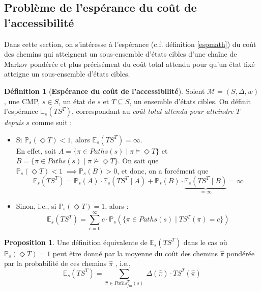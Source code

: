 \documentclass[12pt,a4paper]{report}
\theoremstyle{definition}%
\newtheorem{definition}{Définition}[chapter]
\newtheorem{proposition}{Proposition}[chapter]
\theoremstyle{remark}
\newcommand{\ie}{i.e., }
\newcommand{\cf}{c.f. }
\newcommand{\pr}{\mathbb{P}}
\let\labelitemi\labelitemii
\begin{document}
\subsection{Problème de l'espérance du coût de l'accessibilité} \label{pb-esp-cout-acc}
Dans cette section, on s'intéresse à l'espérance (\cf définition \ref{espmath}) du coût des chemins qui atteignent un sous-ensemble d'états cibles d'une chaîne de Markov pondérée et plus précisément du coût total attendu pour qu'un état fixé atteigne un sous-ensemble d'états cibles.

\begin{definition}[\textbf{Espérance du coût de l'accessibilité}] \label{esp-access}
	Soient $\mathcal{M} = (S, \Delta, w)$, une CMP, $s \in S$, un état de $s$ et $T \subseteq S$, un ensemble d'états cibles. On définit l'espérance $\mathbb{E}_s(TS^T)$, correspondant au \textit{coût total attendu pour atteindre $T$ depuis $s$} comme suit :
	\begin{itemize}
	\renewcommand{\labelitemi}{\tiny$\bullet$}
	\item Si $\pr_s(\Diamond T) < 1$, alors $\mathbb{E}_s(TS^T) = \infty$.%
		\\ En effet, soit $A = \{ \pi \in Paths(s) \; | \; \pi \models \Diamond T  \}$ et $B = \{ \pi \in Paths(s) \; | \; \pi \not \models \Diamond T  \}$. On sait que $\pr_s(\Diamond T) < 1 \; \implies \pr_s(B) > 0$, et donc, on a forcément que
		\[
			\mathbb{E}_s (TS^T) = \pr_s(A) \cdot \mathbb{E}_s(TS^T \; | \; A) + \pr_s(B) \cdot \underbrace{\mathbb{E}_s(TS^T \; | \; B)}_{ = \infty } = \infty
		\]
	\item Sinon, \ie si $\pr_s(\Diamond T) = 1$, alors :
	\[ \mathbb{E}_s(TS^T) = \sum_{c = 0}^\infty c \cdot \pr_s(\{\pi \in Paths(s) \; | \; TS^T(\pi) = c \})\]
	\end{itemize}
\end{definition}

\begin{proposition}
			Une définition équivalente de $\mathbb{E}_s(TS^T)$ dans le cas où $\pr_s(\Diamond T) = 1$ peut être donné par la moyenne du coût des chemins $\hat{\pi}$ pondérée par la probabilité de ces chemins $\hat{\pi}$ %
	, \ie
	\[\mathbb{E}_s(TS^T) = \sum_{\hat{\pi} \in Paths_{fin}^T(s)}\ \Delta(\hat{\pi}) \cdot TS^T(\hat{\pi})\]
\end{proposition}
\end{document}
